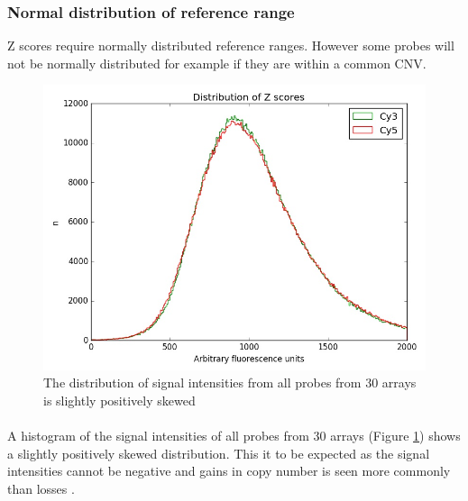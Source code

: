 \subsubsection{Normal distribution of reference range}
Z scores require normally distributed reference ranges. However some probes will not be normally distributed for example if they are within a common CNV. 
\begin{figure}[h]
\centering
\includegraphics[width=1\linewidth]{./Figures/distributionof30arrays}
\caption[The distribution of signal intensities from 30 arrays]{The distribution of signal intensities from all probes from 30 arrays is slightly positively skewed}
\label{fig:distributionof30arrays}
\end{figure}

\paragraph*{}
A histogram of the signal intensities of all probes from 30 arrays (Figure \ref{fig:distributionof30arrays}) shows a slightly positively skewed distribution. This it to be expected as the signal intensities cannot be negative and gains in copy number is seen more commonly than losses \cite{zhang2009}.

